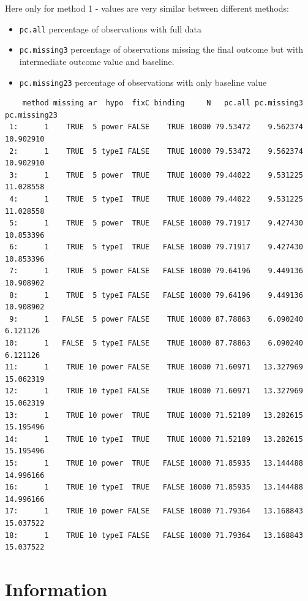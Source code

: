 \documentclass[12pt]{article}
\begin{document}
Here only for method 1 - values are very similar between different
methods:
\begin{itemize}
\item \texttt{pc.all} percentage of observations with full data
\item \texttt{pc.missing3} percentage of observations missing the final outcome
but with intermediate outcome value and baseline.
\item \texttt{pc.missing23} percentage of observations with only baseline value
\end{itemize}
\begin{verbatim}
    method missing ar  hypo  fixC binding     N   pc.all pc.missing3 pc.missing23
 1:      1    TRUE  5 power FALSE    TRUE 10000 79.53472    9.562374    10.902910
 2:      1    TRUE  5 typeI FALSE    TRUE 10000 79.53472    9.562374    10.902910
 3:      1    TRUE  5 power  TRUE    TRUE 10000 79.44022    9.531225    11.028558
 4:      1    TRUE  5 typeI  TRUE    TRUE 10000 79.44022    9.531225    11.028558
 5:      1    TRUE  5 power  TRUE   FALSE 10000 79.71917    9.427430    10.853396
 6:      1    TRUE  5 typeI  TRUE   FALSE 10000 79.71917    9.427430    10.853396
 7:      1    TRUE  5 power FALSE   FALSE 10000 79.64196    9.449136    10.908902
 8:      1    TRUE  5 typeI FALSE   FALSE 10000 79.64196    9.449136    10.908902
 9:      1   FALSE  5 power FALSE    TRUE 10000 87.78863    6.090240     6.121126
10:      1   FALSE  5 typeI FALSE    TRUE 10000 87.78863    6.090240     6.121126
11:      1    TRUE 10 power FALSE    TRUE 10000 71.60971   13.327969    15.062319
12:      1    TRUE 10 typeI FALSE    TRUE 10000 71.60971   13.327969    15.062319
13:      1    TRUE 10 power  TRUE    TRUE 10000 71.52189   13.282615    15.195496
14:      1    TRUE 10 typeI  TRUE    TRUE 10000 71.52189   13.282615    15.195496
15:      1    TRUE 10 power  TRUE   FALSE 10000 71.85935   13.144488    14.996166
16:      1    TRUE 10 typeI  TRUE   FALSE 10000 71.85935   13.144488    14.996166
17:      1    TRUE 10 power FALSE   FALSE 10000 71.79364   13.168843    15.037522
18:      1    TRUE 10 typeI FALSE   FALSE 10000 71.79364   13.168843    15.037522
\end{verbatim}

\clearpage

\section{Information}
\label{sec:org8ec6aaf}
\end{document}
